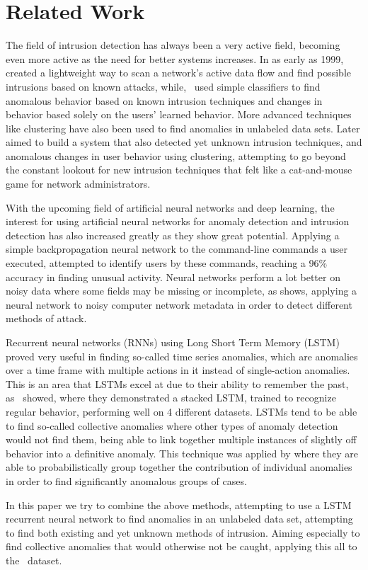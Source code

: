 \chapter{Related Work}\label{ch:related_work}

The field of intrusion detection has always been a very active field, becoming even more active as the need for better systems increases. In as early as 1999,~\cite{roesch1999snort} created a lightweight way to scan a network's active data flow and find possible intrusions based on known attacks, while,~\cite{lee1998data} used simple classifiers to find anomalous behavior based on known intrusion techniques and changes in behavior based solely on the users' learned behavior. More advanced techniques like clustering have also been used to find anomalies in unlabeled data sets. Later \cite{Portnoy01intrusiondetection} aimed to build a system that also detected yet unknown intrusion techniques, and anomalous changes in user behavior using clustering, attempting to go beyond the constant lookout for new intrusion techniques that felt like a cat-and-mouse game for network administrators.

With the upcoming field of artificial neural networks and deep learning, the interest for using artificial neural networks for anomaly detection and intrusion detection has also increased greatly as they show great potential. Applying a simple backpropagation neural network to the command-line commands a user executed, \cite{ryan1998intrusion} attempted to identify users by these commands, reaching a 96\% accuracy in finding unusual activity. Neural networks perform a lot better on noisy data where some fields may be missing or incomplete, as \cite{cannady1998artificial} shows, applying a neural network to noisy computer network metadata in order to detect different methods of attack.

Recurrent neural networks (RNNs) using Long Short Term Memory (LSTM) proved very useful in finding so-called time series anomalies, which are anomalies over a time frame with multiple actions in it instead of single-action anomalies. This is an area that LSTMs excel at due to their ability to remember the past, as~\cite{malhotra2015long} showed, where they demonstrated a stacked LSTM, trained to recognize regular behavior, performing well on 4 different datasets. LSTMs tend to be able to find so-called collective anomalies where other types of anomaly detection would not find them, being able to link together multiple instances of slightly off behavior into a definitive anomaly. This technique was applied by \cite{olsson2015probabilistic} where they are able to probabilistically group together the contribution of individual anomalies in order to find significantly anomalous groups of cases.

In this paper we try to combine the above methods, attempting to use a LSTM recurrent neural network to find anomalies in an unlabeled data set, attempting to find both existing and yet unknown methods of intrusion. Aiming especially to find collective anomalies that would otherwise not be caught, applying this all to the~\cite{akent-2015-enterprise-data} dataset. 